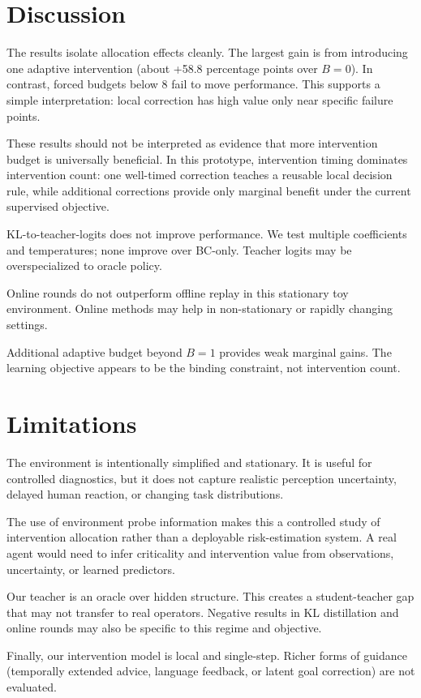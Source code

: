 \documentclass{article}
\begin{document}
\section{Discussion}
The results isolate allocation effects cleanly. The largest gain is from introducing one adaptive intervention (about +58.8 percentage points over $B{=}0$). In contrast, forced budgets below 8 fail to move performance. This supports a simple interpretation: local correction has high value only near specific failure points.

These results should not be interpreted as evidence that more intervention budget is universally beneficial. In this prototype, intervention timing dominates intervention count: one well-timed correction teaches a reusable local decision rule, while additional corrections provide only marginal benefit under the current supervised objective.

KL-to-teacher-logits does not improve performance. We test multiple coefficients and temperatures; none improve over BC-only. Teacher logits may be overspecialized to oracle policy.

Online rounds do not outperform offline replay in this stationary toy environment. Online methods may help in non-stationary or rapidly changing settings.

Additional adaptive budget beyond $B{=}1$ provides weak marginal gains. The learning objective appears to be the binding constraint, not intervention count.

\section{Limitations}
The environment is intentionally simplified and stationary. It is useful for controlled diagnostics, but it does not capture realistic perception uncertainty, delayed human reaction, or changing task distributions.

The use of environment probe information makes this a controlled study of intervention allocation rather than a deployable risk-estimation system. A real agent would need to infer criticality and intervention value from observations, uncertainty, or learned predictors.

Our teacher is an oracle over hidden structure. This creates a student-teacher gap that may not transfer to real operators. Negative results in KL distillation and online rounds may also be specific to this regime and objective.

Finally, our intervention model is local and single-step. Richer forms of guidance (temporally extended advice, language feedback, or latent goal correction) are not evaluated.
\end{document}
